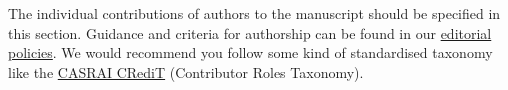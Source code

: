 \documentclass[a4paper,num-refs]{oup-contemporary}
\begin{document}
The individual contributions of authors to the manuscript should be specified in this section. Guidance and criteria for authorship can be found in our \href{https://academic.oup.com/gigascience/pages/editorial_policies_and_reporting_standards}{editorial policies}. We would recommend you follow some kind of standardised taxonomy like the \href{http://docs.casrai.org/CRediT}{CASRAI CRediT} (Contributor Roles Taxonomy).










\end{document}
